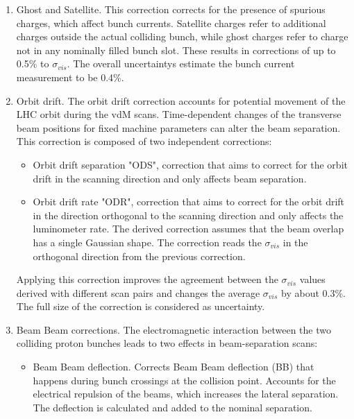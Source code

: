 \begin{enumerate}

\item Ghost and Satellite. This correction corrects for the presence of spurious charges, which affect bunch currents. Satellite charges refer to additional charges outside the actual colliding bunch, while ghost charges refer to charge not in any nominally filled bunch slot. These results in corrections of up to 0.5\% to $\sigma_{vis}$. The overall uncertaintys estimate the bunch current measurement  to be 0.4\%.

\item Orbit drift. The orbit drift correction accounts for potential movement of the LHC orbit during the vdM scans. Time-dependent changes of the transverse beam positions for fixed machine parameters can alter the beam separation. This correction is composed of two independent corrections: 

\begin{itemize}

\item Orbit drift separation "ODS", correction that aims to correct for the orbit drift in the scanning direction and only affects beam separation. 

\item  Orbit drift rate "ODR", correction that aims to correct for the orbit drift in the direction orthogonal to the scanning direction and only affects the luminometer rate. The derived correction assumes that the beam overlap has a single Gaussian shape. The correction reads the $\sigma_{vis}$ in the orthogonal direction from the previous correction. 
\end{itemize}

Applying this correction improves the agreement between the $\sigma_{vis}$ values derived with different scan pairs and changes the average $\sigma_{vis}$ by about 0.3\%. The full size of the correction is considered as uncertainty.

\item Beam Beam corrections.  The electromagnetic interaction between the two colliding proton bunches leads to two effects in beam-separation scans:

\begin{itemize}

\item Beam Beam deflection. Corrects Beam Beam deflection (BB) that happens during bunch crossings at the collision point. Accounts for the electrical repulsion of the beams, which increases the lateral separation. The deflection is calculated and added to the nominal separation.


\end{itemize}
\end{enumerate}
